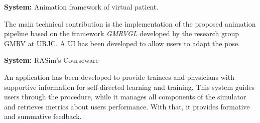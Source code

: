 



\textbf{System:} Animation framework of virtual patient.

The main technical contribution is the implementation of the proposed animation pipeline based on the framework \emph{GMRVGL} developed by the research group \acs{GMRV} at \acs{URJC}. A UI has been developed to allow users to adapt the pose.


\textbf{System:} \acs{RASim}'s Courseware

An application has been developed to provide trainees and physicians with supportive information for self-directed learning and training. This system guides users through the procedure, while it manages all components of the simulator and retrieves metrics about users performance. With that, it provides formative and summative feedback.


